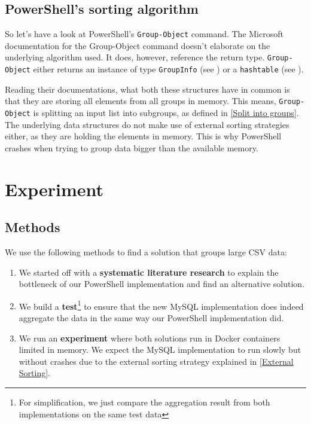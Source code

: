 \subsection{PowerShell's sorting algorithm} \label{PowerShell Sorting}

So let's have a look at \gls{PowerShell}'s \verb+Group-Object+ command.
The Microsoft documentation \cite{docPSGO} for the Group-Object
command doesn't elaborate on the underlying algorithm used.
It does, however, reference the return type.
\verb+Group-Object+ either returns an instance of type
\verb+GroupInfo+ (see \cite{docPSGI})
or a \verb+hashtable+ (see \cite{docPSHT}).

Reading their documentations, what both these structures have in common
is that they are storing all elements from all groups in memory. This means,
\verb+Group-Object+ is splitting an input list into subgroups,
as defined in \ref{Split into groups}. The underlying data structures
do not make use of external sorting strategies either, as they are
holding the elements in memory. This is why \gls{PowerShell} crashes when
trying to group data bigger than the available memory.

\newpage

\section{Experiment}

\subsection{Methods}

We use the following methods to find a solution that groups large \gls{CSV} data:

\begin{enumerate}
    \item We started off with a \textbf{systematic literature research}
        to explain the bottleneck of our \gls{PowerShell} implementation
        and find an alternative solution.
    \item We build a \textbf{test}\footnote{For simplification,
        we just compare the aggregation result from both
        implementations on the same test data} to ensure that the new
        \gls{MySQL} implementation does indeed aggregate the data in the same way
        our \gls{PowerShell} implementation did.
    \item We run an \textbf{experiment} where both solutions run in
        \gls{Docker} containers limited in memory. We expect the \gls{MySQL} implementation
        to run slowly but without crashes due to the external sorting
        strategy explained in \ref{External Sorting}.
\end{enumerate}

